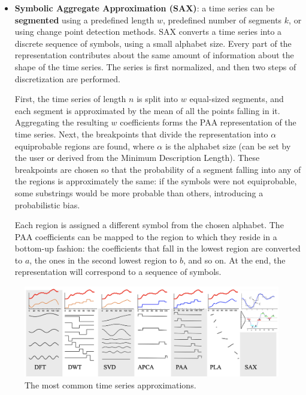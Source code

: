\begin{itemize}
    \item \textbf{Symbolic Aggregate Approximation (SAX)}: a time series can be \textbf{segmented} using a predefined length $w$, predefined number of segments $k$, or using change point detection methods. SAX converts a time series into a discrete sequence of symbols, using a small alphabet size. Every part of the representation contributes about the same amount of information about the shape of the time series. The series is first normalized, and then two steps of discretization are performed.

    First, the time series of length $n$ is split into $w$ equal-sized segments, and each segment is approximated by the mean of all the points falling in it. Aggregating the resulting $w$ coefficients forms the PAA representation of the time series. Next, the breakpoints that divide the representation into $\alpha$ equiprobable regions are found, where $\alpha$ is the alphabet size (can be set by the user or derived from the Minimum Description Length). These breakpoints are chosen so that the probability of a segment falling into any of the regions is approximately the same: if the symbols were not equiprobable, some substrings would be more probable than others, introducing a probabilistic bias.

    Each region is assigned a different symbol from the chosen alphabet. The PAA coefficients can be mapped to the region to which they reside in a bottom-up fashion: the coefficients that fall in the lowest region are converted to $a$, the ones in the second lowest region to $b$, and so on. At the end, the representation will correspond to a sequence of symbols.
\end{itemize}
\clearpage
\begin{figure}[ht]
    \centering
    \includegraphics[width=1.0\linewidth]{img/approximations.png}
    \caption{The most common time series approximations.}
    \label{fig:approx-ts}
\end{figure}
